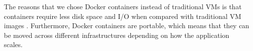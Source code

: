 The reasons that we chose Docker containers instead of traditional \glspl{VM} is that containers
require less disk space and I/O when compared with traditional \gls{VM} images \cite{merkel2014docker}.
Furthermore, Docker containers are portable, which means that they can be moved across different
infrastructures depending on how the application scales.
